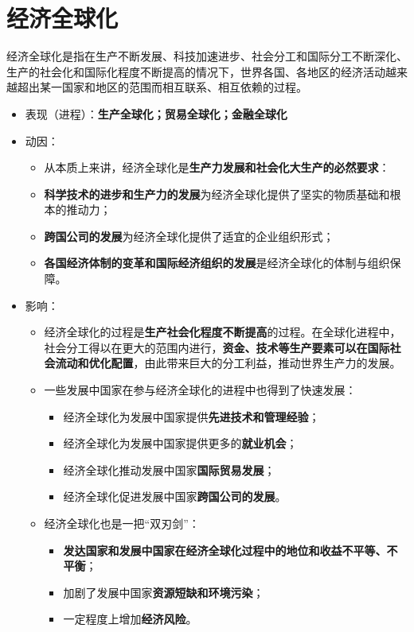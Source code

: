 \documentclass[12pt,openany]{ctexbook}
\begin{document}
\section{经济全球化}
\begin{mdquote}
经济全球化是指在生产不断发展、科技加速进步、社会分工和国际分工不断深化、生产的社会化和国际化程度不断提高的情况下，世界各国、各地区的经济活动越来越超出某一国家和地区的范围而相互联系、相互依赖的过程。
\end{mdquote}
\begin{itemize}
  \item 表现（进程）：\textbf{生产全球化；贸易全球化；金融全球化}
  \item 动因：
\begin{itemize}
  \item 从本质上来讲，经济全球化是\textbf{生产力发展和社会化大生产的必然要求}：
  \item \textbf{科学技术的进步和生产力的发展}为经济全球化提供了坚实的物质基础和根本的推动力；
  \item \textbf{跨国公司的发展}为经济全球化提供了适宜的企业组织形式；
  \item \textbf{各国经济体制的变革和国际经济组织的发展}是经济全球化的体制与组织保障。
\end{itemize}
  \item 影响：
\begin{itemize}
  \item 经济全球化的过程是\textbf{生产社会化程度不断提高}的过程。在全球化进程中，社会分工得以在更大的范围内进行，\textbf{资金、技术等生产要素可以在国际社会流动和优化配置}，由此带来巨大的分工利益，推动世界生产力的发展。
  \item 一些发展中国家在参与经济全球化的进程中也得到了快速发展：
\begin{itemize}
  \item 经济全球化为发展中国家提供\textbf{先进技术和管理经验}；
  \item 经济全球化为发展中国家提供更多的\textbf{就业机会}；
  \item 经济全球化推动发展中国家\textbf{国际贸易发展}；
  \item 经济全球化促进发展中国家\textbf{跨国公司的发展}。
\end{itemize}
  \item 经济全球化也是一把“双刃剑”：
\begin{itemize}
  \item \textbf{发达国家和发展中国家在经济全球化过程中的地位和收益不平等、不平衡}；
  \item 加剧了发展中国家\textbf{资源短缺和环境污染}；
  \item 一定程度上增加\textbf{经济风险}。
\end{itemize}
\end{itemize}
\end{itemize}
\end{document}
